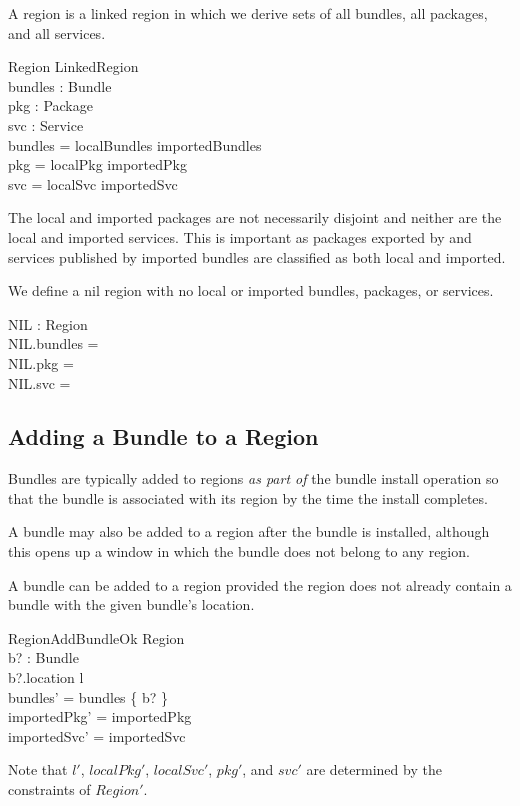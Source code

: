 \documentclass[a4paper,9pt]{article}
\begin{document}
A region is a linked region in which we derive sets of all bundles, all packages, and all services.
\begin{schema}{Region}
  LinkedRegion \\
  bundles : \power Bundle \\
  pkg : \power Package \\
  svc : \power Service \\
\where
  bundles = localBundles \cup importedBundles \\
  pkg = localPkg \cup importedPkg \\
  svc = localSvc \cup importedSvc \\
\end{schema}
The local and imported packages are not necessarily disjoint and neither are the local and imported
services. This is important as packages exported by and services published by imported bundles
are classified as both local and imported.

We define a nil region with no local or imported bundles, packages, or services.
\begin{axdef}
  NIL : Region \\
\where
 NIL.bundles = \emptyset \\
 NIL.pkg = \emptyset \\
 NIL.svc = \emptyset \\
 \end{axdef}

\subsection{Adding a Bundle to a Region}

Bundles are typically added to regions \textit{as part of} the bundle install operation
so that the bundle is associated with its region by the time the
install completes.

A bundle may also be added to a region after the bundle is installed, although this opens up a window in
which the bundle does not belong to any region.

A bundle can be added to a region provided the region does not already contain a bundle with
the given bundle's location.
\begin{schema}{RegionAddBundleOk}
  \Delta Region \\
  b? : Bundle \\
\where
  b?.location \notin \dom l \\
  bundles' = bundles \cup \{ b? \} \\
  importedPkg' = importedPkg \\
  importedSvc' = importedSvc \\
\end{schema}
Note that $l'$, $localPkg'$, $localSvc'$, $pkg'$, and $svc'$ are determined by the constraints of $Region'$.
\end{document}
